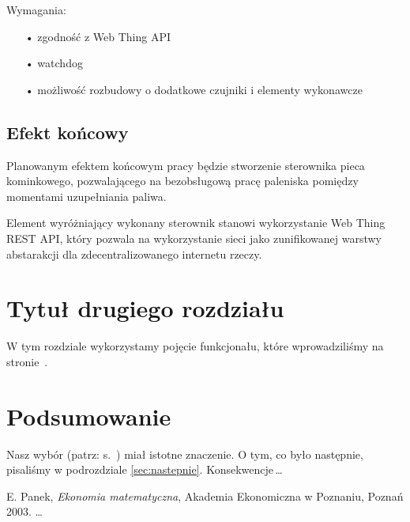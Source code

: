 \documentclass[11pt,a4paper]{report}
\begin{document}
 Wymagania:
 \begin{enumerate}
 \item[•] zgodność z Web Thing API
 \item[•] watchdog
 \item[•] możliwość rozbudowy o dodatkowe czujniki i elementy wykonawcze
 \end{enumerate}
 
  
 
 \section{Efekt końcowy}
 Planowanym efektem końcowym pracy będzie stworzenie sterownika pieca kominkowego, pozwalającego na bezobsługową pracę paleniska pomiędzy momentami uzupełniania paliwa.

 Element wyróżniający wykonany sterownik stanowi wykorzystanie Web Thing REST API, który pozwala na wykorzystanie sieci jako zunifikowanej warstwy abstarakcji dla zdecentralizowanego internetu rzeczy.
 


 \chapter{Tytuł drugiego rozdziału}
 W tym rozdziale wykorzystamy pojęcie funkcjonału, które
 wprowadziliśmy na stronie~\pageref{poj:funkcjonal}.

 \chapter*{Podsumowanie}

 Nasz wybór (patrz: s.~\pageref{sec:wybor}) miał istotne znaczenie.
 O tym, co było następnie, pisaliśmy w podrozdziale \ref{sec:nastepnie}.
 Konsekwencje\,\ldots

 \begin{thebibliography}{9}
 E. Panek, \emph{Ekonomia matematyczna}, Akademia Ekonomiczna w Poznaniu,
 Poznań 2003.
 \ldots
 \end{thebibliography}

 
\end{document}
